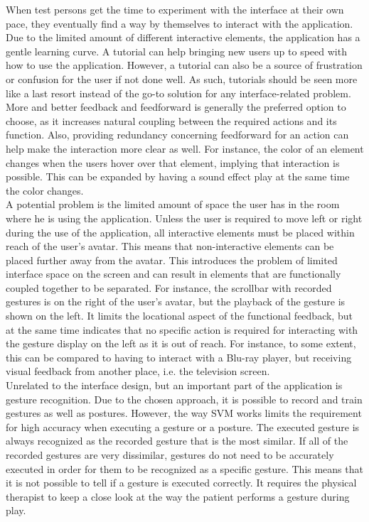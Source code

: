 When test persons get the time to experiment with the interface at their own pace, they eventually find a way by themselves to interact with the application. Due to the limited amount of different interactive elements, the application has a gentle learning curve. A tutorial can help bringing new users up to speed with how to use the application. However, a tutorial can also be a source of frustration or confusion for the user if not done well. As such, tutorials should be seen more like a last resort instead of the go-to solution for any interface-related problem. More and better feedback and feedforward is generally the preferred option to choose, as it increases natural coupling between the required actions and its function. Also, providing redundancy concerning feedforward for an action can help make the interaction more clear as well. For instance, the color of an element changes when the users hover over that element, implying that interaction is possible. This can be expanded by having a sound effect play at the same time the color changes.\\

A potential problem is the limited amount of space the user has in the room where he is using the application. Unless the user is required to move left or right during the use of the application, all interactive elements must be placed within reach of the user's avatar. This means that non-interactive elements can be placed further away from the avatar. This introduces the problem of limited interface space on the screen and can result in elements that are functionally coupled together to be separated. For instance, the scrollbar with recorded gestures is on the right of the user's avatar, but the playback of the gesture is shown on the left. It limits the locational aspect of the functional feedback, but at the same time indicates that no specific action is required for interacting with the gesture display on the left as it is out of reach. For instance, to some extent, this can be compared to having to interact with a Blu-ray player, but receiving visual feedback from another place, i.e. the television screen.\\

Unrelated to the interface design, but an important part of the application is gesture recognition. Due to the chosen approach, it is possible to record and train gestures as well as postures. However, the way SVM works limits the requirement for high accuracy when executing a gesture or a posture. The executed gesture is always recognized as the recorded gesture that is the most similar. If all of the recorded gestures are very dissimilar, gestures do not need to be accurately executed in order for them to be recognized as a specific gesture. This means that it is not possible to tell if a gesture is executed correctly. It requires the physical therapist to keep a close look at the way the patient performs a gesture during play.\\

